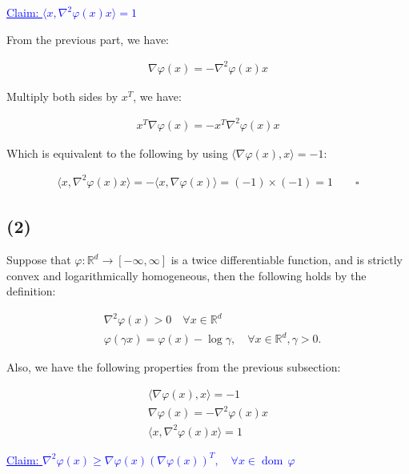 \documentclass{article}
\begin{document}
\textcolor{blue}{\underline{Claim: $\langle x, \nabla^2 \varphi (x) x \rangle = 1$ } }
\bigskip

From the previous part, we have:

\begin{align*}
    \nabla \varphi (x) = - \nabla^2 \varphi (x) x
\end{align*}

Multiply both sides by $x^T$, we have:

\begin{align*}
    x^T \nabla \varphi (x) = - x^T \nabla^2 \varphi (x) x
\end{align*}

Which is equivalent to the following by using $\langle \nabla \varphi (x), x \rangle = - 1$:

\begin{align*}
    \langle x, \nabla^2 \varphi (x) x \rangle = - \langle x, \nabla \varphi (x) \rangle = (-1) \times (-1) = 1 \qquad \square
\end{align*}

\subsection*{(2)}

Suppose that $\varphi: \mathbb{R}^d \to [- \infty, \infty]$ is a twice differentiable function, 
and is strictly convex and logarithmically homogeneous, then the following holds by the definition:

\begin{align*}
    &\nabla^2 \varphi (x) > 0 \quad \forall x \in \mathbb{R}^d \\
    &\varphi ( \gamma x ) = \varphi (x) - \log \gamma, \quad \forall x \in \mathbb{R}^d, \gamma > 0.
\end{align*}

Also, we have the following properties from the previous subsection:

\begin{align*}
    \langle \nabla \varphi (x), x \rangle = - 1 \tag{1}\\
    \nabla \varphi (x) = - \nabla^2 \varphi ( x ) x \tag{2}\\
    \langle x, \nabla^2 \varphi (x) x \rangle = 1 \tag{3}
\end{align*}

\textcolor{blue}{\underline{Claim: $\nabla^2 \varphi ( x ) \geq \nabla \varphi ( x ) \left( \nabla \varphi (x) \right)^T , \quad \forall x \in \operatorname{dom}\, \varphi $} }
\bigskip
\end{document}
